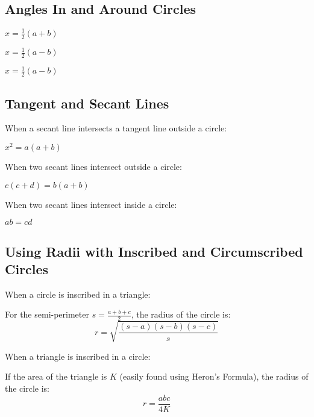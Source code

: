 \documentclass[final, letterpaper, 12pt]{article}
\begin{document}
	\subsection{Angles In and Around Circles}\label{sec: properties of arcs and angles of tangent and secant lines}
		
		
		 $x = \frac{1}{2}(a+b)$
		
		 $x = \frac{1}{2}(a-b)$
		
		 $x = \frac{1}{2}(a-b)$
		
		
	\subsection{Tangent and Secant Lines}\label{sec: properties of the lengths of tangent and secant lines}
	
		When a secant line intersects a tangent line outside a circle:
		
		 $x^2 = a(a+b)$
		
		When two secant lines intersect outside a circle:
		
		 $c(c+d) = b(a+b)$
		
		When two secant lines intersect inside a circle:
		
		 $ab = cd$
		
	\subsection{Using Radii with Inscribed and Circumscribed Circles}\label{sec: special formulae that involve triangles and circles}
	
		When a circle is inscribed in a triangle:
		
		
		
		For the semi-perimeter $s = \frac{a+b+c}{2}$, the radius of the circle is:
		\begin{equation}
			r = \sqrt{\frac{(s-a)(s-b)(s-c)}{s}}
		\end{equation}
		
		When a triangle is inscribed in a circle:
		
		
		
		If the area of the triangle is $K$ (easily found using Heron's Formula), the radius of the circle is:
		\begin{equation}
			r = \frac{abc}{4K}
		\end{equation}
	
\end{document}
